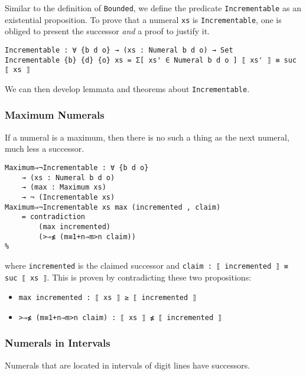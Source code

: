 \documentclass[\main/thesis.tex]{subfiles}
\begin{document}
Similar to the definition of \lstinline|Bounded|, we define the predicate
\lstinline|Incrementable| as an existential proposition.
To prove that a numeral \lstinline|xs| is \lstinline|Incrementable|,
one is obliged to present the successor \textit{and} a proof to justify it.

\begin{lstlisting}[basicstyle=\ttfamily\scriptsize]
Incrementable : ∀ {b d o} → (xs : Numeral b d o) → Set
Incrementable {b} {d} {o} xs = Σ[ xs' ∈ Numeral b d o ] ⟦ xs' ⟧ ≡ suc ⟦ xs ⟧
\end{lstlisting}

We can then develop lemmata and theorems about \lstinline|Incrementable|.

\subsubsection{Maximum Numerals}

If a numeral is a maximum, then there is no such a thing as the next numeral,
much less a successor.

\begin{lstlisting}
Maximum⇒¬Incrementable : ∀ {b d o}
    → (xs : Numeral b d o)
    → (max : Maximum xs)
    → ¬ (Incrementable xs)
Maximum⇒¬Incrementable xs max (incremented , claim)
    = contradiction
        (max incremented)
        (>⇒≰ (m≡1+n⇒m>n claim))
%
\end{lstlisting}
where \lstinline|incremented| is the claimed successor
and \lstinline|claim : ⟦ incremented ⟧ ≡ suc ⟦ xs ⟧|.
This is proven by contradicting these two propositions:

\begin{itemize}
    \item \lstinline|max incremented : ⟦ xs ⟧ ≥ ⟦ incremented ⟧|
    \item \lstinline|>⇒≰ (m≡1+n⇒m>n claim) : ⟦ xs ⟧ ≰ ⟦ incremented ⟧|
\end{itemize}

\subsubsection{Numerals in Intervals}

Numerals that are located in intervals of digit lines have successors.
\end{document}

